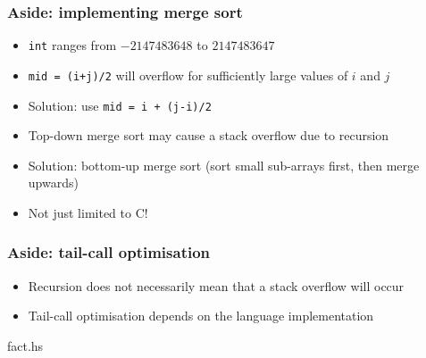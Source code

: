 \documentclass{beamer}
\begin{document}
\begin{frame}
 \frametitle{Aside: implementing merge sort}
 \begin{itemize}
  \item \texttt{int} ranges from $-2147483648$ to $2147483647$
  \item \texttt{mid = (i+j)/2} will overflow for sufficiently large
        values of $i$ and $j$
  \item Solution: use \texttt{mid = i + (j-i)/2} \pause
  \item Top-down merge sort may cause a stack overflow due to recursion
  \item Solution: bottom-up merge sort (sort small sub-arrays first,
        then merge upwards)
  \item Not just limited to C!
 \end{itemize}
\end{frame}

\begin{frame}[fragile]
 \frametitle{Aside: tail-call optimisation}
 \begin{itemize}
  \item Recursion does not necessarily mean that a stack overflow will
        occur
  \item Tail-call optimisation depends on the language implementation
 \end{itemize}
 \begin{lstinputlisting}[language=Haskell, firstline=3, lastline=14]{fact.hs}
 \end{lstinputlisting}
\end{frame}
\end{document}
